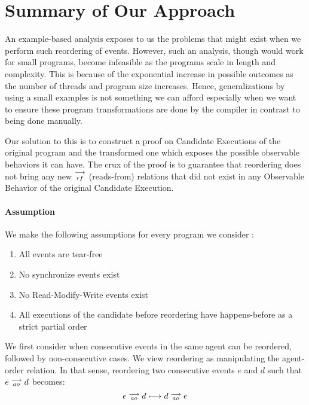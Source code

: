 \section{Summary of Our Approach}

    An example-based analysis exposes to us the problems that might exist when we perform such reordering of events. 
    However, such an analysis, though would work for small programs, become infeasible as the programs scale in length and complexity. 
    This is because of the exponential increase in possible outcomes as the number of threads and program size increases. 
    Hence, generalizations by using a small examples is not something we can afford especially when we want to ensure these program transformations are done by the compiler in contrast to being done manually.
    
    Our solution to this is to construct a proof on Candidate Executions of the original program and the transformed one which exposes the possible observable behaviors it can have.   
    The crux of the proof is to guarantee that reordering does not bring any new $\stackrel{\longrightarrow}{_{rf}}$ (reads-from) relations that did not exist in any Observable Behavior of the original Candidate Execution. 
    

    \paragraph{Assumption}
    We make the following assumptions for every program we consider :
    \begin{enumerate}
        \item All events are tear-free
        \item No synchronize events exist
        \item No Read-Modify-Write events exist
        \item All executions of the candidate before reordering have happens-before as a strict partial order
    \end{enumerate}
    
    We first consider when consecutive events in the same agent can be reordered, followed by non-consecutive cases. 
    We view reordering as manipulating the agent-order relation. In that sense, reordering two consecutive events $e$ and $d$ such that $e \stackrel{\longrightarrow}{_{ao}} d$ becomes:
    \[
        e \stackrel{\longrightarrow}{_{ao}} d 
        \longmapsto
        d \stackrel{\longrightarrow}{_{ao}} e 
    \]

